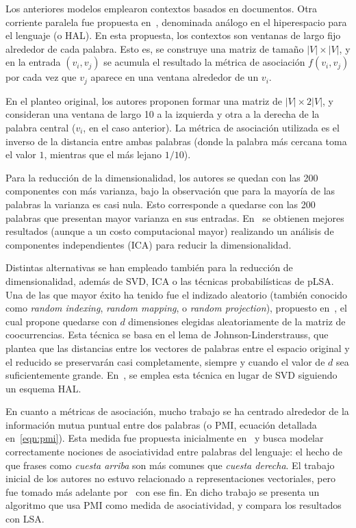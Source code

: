 Los anteriores modelos emplearon contextos basados en documentos. Otra corriente paralela fue
propuesta en~\cite{Lund1995, LundBurgess1996}, denominada análogo en el hiperespacio para el
lenguaje (o HAL). En esta propuesta, los contextos son ventanas de largo fijo alrededor de cada
palabra. Esto es, se construye una matriz de tamaño $|V| \times |V|$, y en la entrada $(v_i, v_j)$
se acumula el resultado la métrica de asociación $f(v_i, v_j)$ por cada vez que $v_j$ aparece en una
ventana alrededor de un $v_i$.

En el planteo original, los autores proponen formar una matriz de $|V| \times 2|V|$, y consideran
una ventana de largo 10 a la izquierda y otra a la derecha de la palabra central ($v_i$, en el caso
anterior). La métrica de asociación utilizada es el inverso de la distancia entre ambas palabras
(donde la palabra más cercana toma el valor $1$, mientras que el más lejano $1/10$).

Para la reducción de la dimensionalidad, los autores se quedan con las 200 componentes con más
varianza, bajo la observación que para la mayoría de las palabras la varianza es casi nula. Esto
corresponde a quedarse con las 200 palabras que presentan mayor varianza en sus entradas.
En~\cite{VayrynenHonkela2004} se obtienen mejores resultados (aunque a un costo computacional mayor)
realizando un análisis de componentes independientes (ICA) para reducir la dimensionalidad.


Distintas alternativas se han empleado también para la reducción de dimensionalidad, además de SVD,
ICA o las técnicas probabilísticas de pLSA\@. Una de las que mayor éxito ha tenido fue el indizado
aleatorio (también conocido como \textit{random indexing}, \textit{random mapping}, o \textit{random
projection}), propuesto en~\cite{Kaski1998}, el cual propone quedarse con $d$ dimensiones elegidas
aleatoriamente de la matriz de coocurrencias. Esta técnica se basa en el lema de
Johnson-Linderstrauss, que plantea que las distancias entre los vectores de palabras entre el
espacio original y el reducido se preservarán casi completamente, siempre y cuando el valor de $d$
sea suficientemente grande. En~\cite{Sahlgren2001}, se emplea esta técnica en lugar de SVD siguiendo
un esquema HAL\@.


En cuanto a métricas de asociación, mucho trabajo se ha centrado alrededor de la información mutua
puntual entre dos palabras (o PMI, ecuación detallada en~\ref{eqn:pmi}). Esta medida fue propuesta
inicialmente en~\cite{ChurchHanks1990} y busca modelar correctamente nociones de asociatividad entre
palabras del lenguaje: el hecho de que frases como \textit{cuesta arriba} son más comunes que
\textit{cuesta derecha}. El trabajo inicial de los autores no estuvo relacionado a representaciones
vectoriales, pero fue tomado más adelante por~\cite{Turney2001} con ese fin. En dicho trabajo se
presenta un algoritmo que usa PMI como medida de asociatividad, y compara los resultados con LSA\@.

